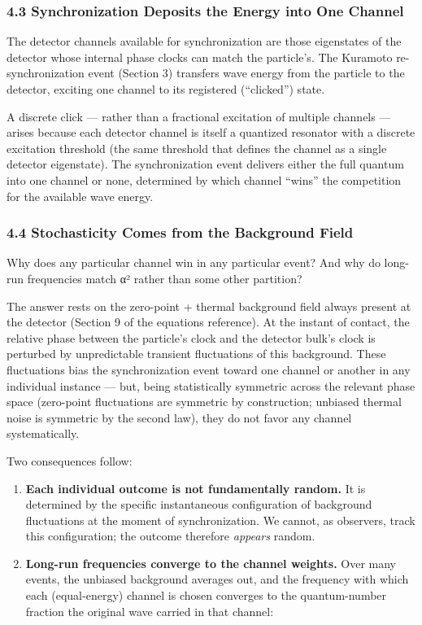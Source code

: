 \documentclass[
]{article}
\newcounter{none} %
\providecommand{\tightlist}{%
  \setlength{\itemsep}{0pt}\setlength{\parskip}{0pt}}
\begin{document}
\subsubsection{4.3 Synchronization Deposits the Energy into One
Channel}\label{synchronization-deposits-the-energy-into-one-channel}

The detector channels available for synchronization are those
eigenstates of the detector whose internal phase clocks can match the
particle's. The Kuramoto re-synchronization event (Section 3) transfers
wave energy from the particle to the detector, exciting one channel to
its registered (``clicked'') state.

A discrete click --- rather than a fractional excitation of multiple
channels --- arises because each detector channel is itself a quantized
resonator with a discrete excitation threshold (the same threshold that
defines the channel as a single detector eigenstate). The
synchronization event delivers either the full quantum into one channel
or none, determined by which channel ``wins'' the competition for the
available wave energy.

\subsubsection{4.4 Stochasticity Comes from the Background
Field}\label{stochasticity-comes-from-the-background-field}

Why does any particular channel win in any particular event? And why do
long-run frequencies match \textbar α\textbar² rather than some other
partition?

The answer rests on the zero-point + thermal background field always
present at the detector (Section 9 of the equations reference). At the
instant of contact, the relative phase between the particle's clock and
the detector bulk's clock is perturbed by unpredictable transient
fluctuations of this background. These fluctuations bias the
synchronization event toward one channel or another in any individual
instance --- but, being statistically symmetric across the relevant
phase space (zero-point fluctuations are symmetric by construction;
unbiased thermal noise is symmetric by the second law), they do not
favor any channel systematically.

Two consequences follow:

\begin{enumerate}
\def\labelenumi{\arabic{enumi}.}
\tightlist
\item
  \textbf{Each individual outcome is not fundamentally random.} It is
  determined by the specific instantaneous configuration of background
  fluctuations at the moment of synchronization. We cannot, as
  observers, track this configuration; the outcome therefore
  \emph{appears} random.
\item
  \textbf{Long-run frequencies converge to the channel weights.} Over
  many events, the unbiased background averages out, and the frequency
  with which each (equal-energy) channel is chosen converges to the
  quantum-number fraction the original wave carried in that channel:
\end{enumerate}
\end{document}
